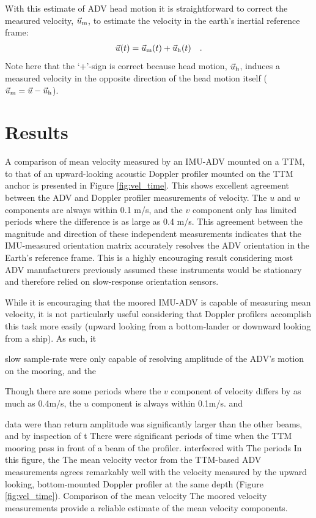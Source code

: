 \documentclass[twocol]{ametsoc}
\begin{document}
With this estimate of ADV head motion it is straightforward to correct the measured velocity, $\vec{u}_\mathrm{m}$, to estimate the velocity in the earth's inertial reference frame:
\begin{align}
  \label{eqn:u_mot_def}
  \vec{u}(t) & = \vec{u}_\mathrm{m}(t) + \vec{u}_\mathrm{h}(t) &  .
\end{align}
Note here that the `+'-sign is correct because head motion, $\vec{u}_\mathrm{h}$, induces a measured velocity in the opposite direction of the head motion itself ($\vec{u}_\mathrm{m} = \vec{u} - \vec{u}_\mathrm{h}$).

\section{Results}

A comparison of mean velocity measured by an IMU-ADV mounted on a TTM, to that of an upward-looking acoustic Doppler profiler mounted on the TTM anchor is presented in Figure \ref{fig:vel_time}. This shows excellent agreement between the ADV and Doppler profiler measurements of velocity. The $u$ and $w$ components are always within 0.1 m/s, and the $v$ component only has limited periods where the difference is as large as 0.4 m/s. This agreement between the magnitude and direction of these independent measurements indicates that the IMU-measured orientation matrix accurately resolves the ADV orientation in the Earth's reference frame. This is a highly encouraging result considering most ADV manufacturers previously assumed these instruments would be stationary and therefore relied on slow-response orientation sensors.

While it is encouraging that the moored IMU-ADV is capable of measuring mean velocity, it is not particularly useful considering that Doppler profilers accomplish this task more easily (upward looking from a bottom-lander or downward looking from a ship). As such, it 

slow sample-rate   were only capable of resolving  amplitude of the ADV's motion on the mooring, and the  \cite{Harding_MotionPaper}

Though there are some periods where the $v$ component of velocity differs by as much as 0.4m/s, the $u$ component is always within 0.1m/s. and 


 data were  than return amplitude was significantly larger than the other beams, and  by inspection of t  There were significant periods of time when the TTM mooring pass in front of a beam of the profiler. interfeered with The periods In this figure, the 
The mean velocity vector from the TTM-based ADV measurements agrees remarkably well with the velocity measured by the upward looking, bottom-mounted Doppler profiler at the same depth (Figure \ref{fig:vel_time}). 
Comparison of the mean velocity The moored velocity measurements provide a reliable estimate of the mean velocity components. 
\end{document}
